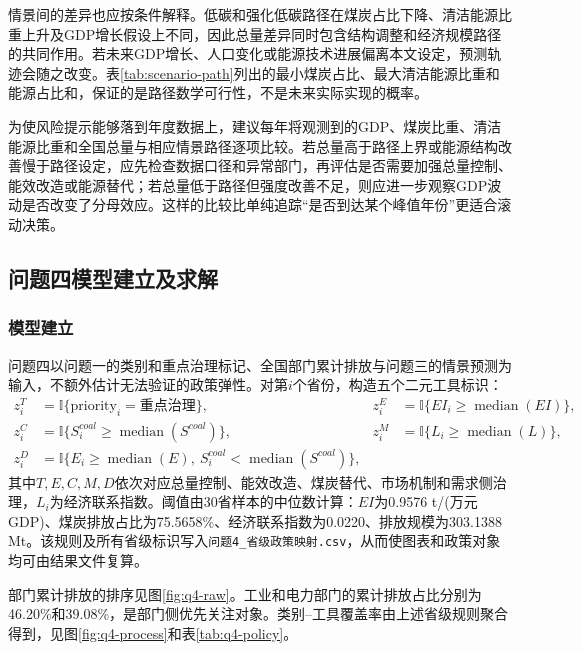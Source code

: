\documentclass[12pt,a4paper]{ctexart}
\theoremstyle{definition}
\theoremstyle{plain}
\theoremstyle{remark}
\begin{document}
情景间的差异也应按条件解释。低碳和强化低碳路径在煤炭占比下降、清洁能源比重上升及GDP增长假设上不同，因此总量差异同时包含结构调整和经济规模路径的共同作用。若未来GDP增长、人口变化或能源技术进展偏离本文设定，预测轨迹会随之改变。表\ref{tab:scenario-path}列出的最小煤炭占比、最大清洁能源比重和能源占比和，保证的是路径数学可行性，不是未来实际实现的概率。

为使风险提示能够落到年度数据上，建议每年将观测到的GDP、煤炭比重、清洁能源比重和全国总量与相应情景路径逐项比较。若总量高于路径上界或能源结构改善慢于路径设定，应先检查数据口径和异常部门，再评估是否需要加强总量控制、能效改造或能源替代；若总量低于路径但强度改善不足，则应进一步观察GDP波动是否改变了分母效应。这样的比较比单纯追踪“是否到达某个峰值年份”更适合滚动决策。
\subsection{问题四模型建立及求解}

\subsubsection{模型建立}
问题四以问题一的类别和重点治理标记、全国部门累计排放与问题三的情景预测为输入，不额外估计无法验证的政策弹性。对第$i$个省份，构造五个二元工具标识：
\begin{equation}
\begin{aligned}
z_{i}^{T}&=\mathbb{I}\{\text{priority}_i=\text{重点治理}\},&
z_{i}^{E}&=\mathbb{I}\{EI_i\geq\operatorname{median}(EI)\},\\
z_{i}^{C}&=\mathbb{I}\{S_{i}^{coal}\geq\operatorname{median}(S^{coal})\},&
z_{i}^{M}&=\mathbb{I}\{L_i\geq\operatorname{median}(L)\},\\
z_{i}^{D}&=\mathbb{I}\{E_i\geq\operatorname{median}(E),\ S_{i}^{coal}<\operatorname{median}(S^{coal})\},
\end{aligned}
\label{eq:policy-map}
\end{equation}
其中$T,E,C,M,D$依次对应总量控制、能效改造、煤炭替代、市场机制和需求侧治理，$L_i$为经济联系指数。阈值由30省样本的中位数计算：$EI$为0.9576 t/(万元 GDP)、煤炭排放占比为75.5658\%、经济联系指数为0.0220、排放规模为303.1388 Mt。该规则及所有省级标识写入\texttt{问题4\_省级政策映射.csv}，从而使图表和政策对象均可由结果文件复算。

部门累计排放的排序见图\ref{fig:q4-raw}。工业和电力部门的累计排放占比分别为46.20\%和39.08\%，是部门侧优先关注对象。类别--工具覆盖率由上述省级规则聚合得到，见图\ref{fig:q4-process}和表\ref{tab:q4-policy}。
\end{document}
